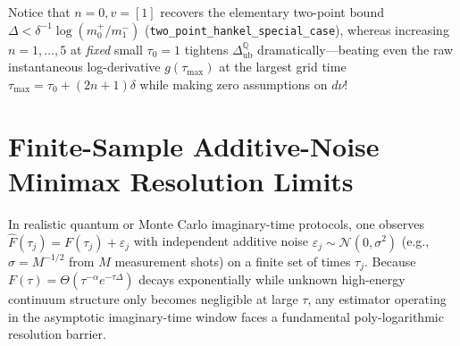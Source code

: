 \documentclass[11pt,a4paper]{article}
\theoremstyle{definition}
\newcommand{\Q}{\mathbb{Q}}
\begin{document}
Notice that $n = 0, v = [1]$ recovers the elementary two-point bound $\Delta < \delta^{-1}\log(m_0^+/m_1^-)$ (\texttt{two\_point\_hankel\_}\allowbreak\texttt{special\_case}), whereas increasing $n = 1, \dots, 5$ at \emph{fixed} small $\tau_0 = 1$ tightens $\Delta_{\mathrm{ub}}^{\Q}$ dramatically—beating even the raw instantaneous log-derivative $g(\tau_{\max})$ at the largest grid time $\tau_{\max} = \tau_0 + (2n+1)\delta$ while making zero assumptions on $d\nu$!

\section{Finite-Sample Additive-Noise Minimax Resolution Limits}
\label{sec:minimax}

In realistic quantum or Monte Carlo imaginary-time protocols, one observes $\hat{F}(\tau_j) = F(\tau_j) + \varepsilon_j$ with independent additive noise $\varepsilon_j \sim \mathcal{N}(0, \sigma^2)$ (e.g., $\sigma = M^{-1/2}$ from $M$ measurement shots) on a finite set of times $\tau_j$. Because $F(\tau) = \Theta(\tau^{-\alpha} e^{-\tau \Delta})$ decays exponentially while unknown high-energy continuum structure only becomes negligible at large $\tau$, any estimator operating in the asymptotic imaginary-time window faces a fundamental poly-logarithmic resolution barrier.
\end{document}
